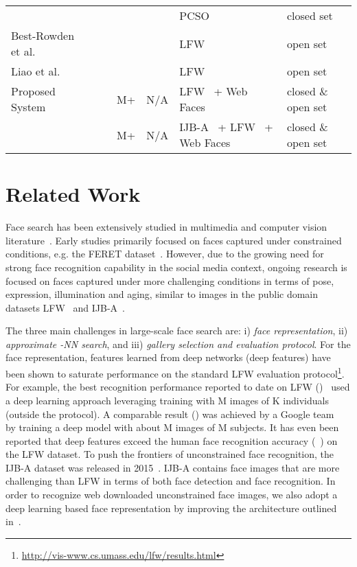 \documentclass[10pt,journal,compsoc]{IEEEtran}
\begin{document}
\begin{table*}[htbp]
\begin{minipage}{\textwidth}
\begin{tabular}{lrrrrll}
                                          &  &  &  &  & PCSO~\cite{fr:cots_cluster} & closed set\\
Best-Rowden et al.~\cite{faceretrieval:fusion} &  &  &  &    & LFW~\cite{DB:LFWTech} & open set \\
Liao et al.~\cite{BLUFR}                       &   &  &  &  & LFW~\cite{DB:LFWTech} & open set \\
\midrule
Proposed System &  &  & M+ & N/A &  LFW~\cite{DB:LFWTech} + Web Faces & closed \& open set\\
                &  &  & M+ & N/A &  IJB-A~\cite{db:janus} + LFW~\cite{DB:LFWTech} + Web Faces & closed \& open set\\
\bottomrule
\end{tabular}
\end{minipage}
\end{table*}

\section{Related Work}
Face search has been extensively studied in multimedia and computer vision literature~\cite{book:HBforFR2011}. Early studies primarily focused on faces captured under constrained conditions, e.g. the FERET dataset~\cite{db:FERET}. However,
due to the growing need for strong face recognition capability in the social media context, ongoing research is focused on faces captured under more challenging conditions in terms of pose, expression, illumination and aging, similar to images in the public domain datasets LFW~\cite{DB:LFWTech} and IJB-A~\cite{db:janus}.

The three main challenges in large-scale face search are: i) \emph{face representation}, ii) \emph{approximate -NN search}, and iii) \emph{gallery selection and evaluation protocol}. For the face representation, features learned from deep networks (deep features) have been shown to saturate performance on the standard LFW evaluation protocol\footnote{\url{http://vis-www.cs.umass.edu/lfw/results.html}}.
For example, the best recognition performance reported to date on LFW ()~\cite{dl:tencent} used a deep learning approach leveraging training with M images of K individuals (outside the protocol). A comparable result () was achieved by a Google team~\cite{dl:facenet} by training a deep model with about M images of M subjects. It has even been reported that deep features exceed the human face recognition accuracy (~\cite{CAVE_0296}) on the LFW dataset. To push the frontiers of unconstrained face recognition, the IJB-A dataset was released in 2015~\cite{db:janus}. IJB-A contains face images that are more challenging than LFW in terms of both face detection and face recognition. In order to recognize web downloaded unconstrained face images, we also adopt a deep learning based face representation by improving the architecture outlined in~\cite{DB:CASIA}.
\end{document}
